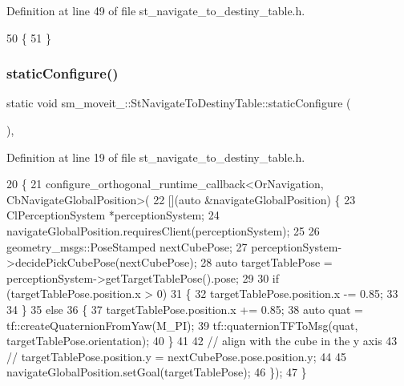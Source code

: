 Definition at line 49 of file st\+\_\+navigate\+\_\+to\+\_\+destiny\+\_\+table.\+h.


\begin{DoxyCode}
50         \{
51         \}
\end{DoxyCode}
\mbox{\label{structsm__moveit__4_1_1StNavigateToDestinyTable_a2a53aaa5ef99206441170e41e59462e9}} 
\subsubsection{\texorpdfstring{static\+Configure()}{staticConfigure()}}
{\footnotesize\ttfamily static void sm\+\_\+moveit\+\_\+::\+St\+Navigate\+To\+Destiny\+Table\+::static\+Configure (\begin{DoxyParamCaption}{ }\end{DoxyParamCaption})\hspace{0.3cm}{\ttfamily [inline]}, {\ttfamily [static]}}



Definition at line 19 of file st\+\_\+navigate\+\_\+to\+\_\+destiny\+\_\+table.\+h.


\begin{DoxyCode}
20         \{
21             configure\_orthogonal\_runtime\_callback<OrNavigation, CbNavigateGlobalPosition>(
22                 [](\textcolor{keyword}{auto} &navigateGlobalPosition) \{
23                     ClPerceptionSystem *perceptionSystem;
24                     navigateGlobalPosition.requiresClient(perceptionSystem);
25 
26                     geometry\_msgs::PoseStamped nextCubePose;
27                     perceptionSystem->decidePickCubePose(nextCubePose);
28                     \textcolor{keyword}{auto} targetTablePose = perceptionSystem->getTargetTablePose().pose;
29 
30                     \textcolor{keywordflow}{if} (targetTablePose.position.x > 0)
31                     \{
32                         targetTablePose.position.x -= 0.85;
33                         
34                     \}
35                     \textcolor{keywordflow}{else}
36                     \{
37                         targetTablePose.position.x += 0.85;
38                         \textcolor{keyword}{auto} quat = tf::createQuaternionFromYaw(M\_PI);
39                         tf::quaternionTFToMsg(quat, targetTablePose.orientation);
40                     \}
41 
42                     \textcolor{comment}{// align with the cube in the y axis}
43                     \textcolor{comment}{// targetTablePose.position.y = nextCubePose.pose.position.y;}
44 
45                     navigateGlobalPosition.setGoal(targetTablePose);
46                 \});
47         \}
\end{DoxyCode}


